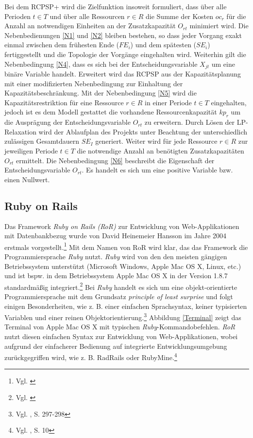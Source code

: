 \documentclass[a4paper,12pt,parskip,bibtotoc,liststotoc]{article}
\begin{document}
Bei dem RCPSP+ wird die Zielfunktion insoweit formuliert, dass über alle Perioden $t\in T$ und über alle Ressourcen $r\in R$ die Summe der Kosten $oc_r$ für die Anzahl an notwendigen Einheiten an der Zusatzkapazität $O_{rt}$ minimiert wird. Die Nebenbedienungen \eqref{N1} und \eqref{N2} bleiben bestehen, so dass jeder Vorgang exakt einmal zwischen dem frühesten Ende ($FE_i$) und dem spätesten ($SE_i$) fertiggestellt und die Topologie der Vorgänge eingehalten wird. Weiterhin gilt die Nebenbedingung \eqref{N4}, dass es sich bei der Entscheidungsvariable $X_{jt}$ um eine binäre Variable handelt. Erweitert wird das RCPSP aus der Kapazitätsplanung mit einer modifizierten Nebenbedingung zur Einhaltung der Kapazitätsbeschränkung. Mit der Nebenbedingung \eqref{N5} wird die Kapazitätsrestriktion für eine Ressource $r\in R$ in einer Periode $t\in T$ eingehalten, jedoch ist es dem Modell gestattet die vorhandene Ressourcenkapazität $kp_r$ um die Ausprägung der Entscheidungsvariable $O_{rt}$ zu erweitern. Durch Lösen der LP-Relaxation wird der Ablaufplan des Projekts unter Beachtung der unterschiedlich zulässigen Gesamtdauern $SE_I$ generiert. Weiter wird für jede Ressource $r\in R$ zur jeweiligen Periode $t\in T$ die notwendige Anzahl an benötigten Zusatzkapazitäten $O_{rt}$ ermittelt. Die Nebenbedingung \eqref{N6} beschreibt die Eigenschaft der Entscheidungsvariable $O_{rt}$. Es handelt es sich um eine positive Variable bzw. einen Nullwert.

\subsection{Ruby on Rails}
Das Framework \textit{Ruby on Rails (RoR)} zur Entwicklung von Web-Applikationen mit Datenbankbezug wurde von David Heinemeier Hansson im Jahre 2004 erstmals vorgestellt.\footnote{Vgl. \cite{ruby2004}} Mit dem Namen von RoR wird klar, das das Framework die Programmiersprache \textit{Ruby} nutzt. \textit{Ruby} wird von den den meisten gängigen Betriebssystem unterstützt (Microsoft Windows, Apple Mac OS X, Linux, etc.) und ist bspw. in dem Betriebssystem Apple Mac OS X in der Version 1.8.7 standardmäßig integriert.\footnote{Vgl. \cite{ruby-schienen}} Bei \textit{Ruby} handelt es sich um eine objekt-orientierte Programmiersprache mit dem Grundsatz \textit{principle of least surprise} und folgt einigen Besonderheiten, wie z. B. einer einfachen Sprachsyntax, keiner typisierten Variablen und einer reinen Objektorientierung.\footnote{Vgl. \cite{Walter:2008aa}, S. 297-298} Abbildung \ref{Terminal} zeigt das Terminal von Apple Mac OS X mit typischen \textit{Ruby}-Kommandobefehlen. \textit{RoR} nutzt diesen einfachen Syntax zur Entwicklung von Web-Applikationen, wobei aufgrund der einfacherer Bedienung auf integrierte Entwicklungsumgebung zurückgegriffen wird, wie z. B. RadRails oder RubyMine.\footnote{Vgl. \cite{hartl2012ruby}, S. 10} \\
\end{document}
